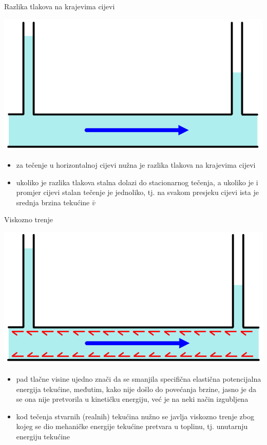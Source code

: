 \documentclass[croatian]{beamer}
\begin{document}
\begin{frame}{Razlika tlakova na krajevima cijevi}

\begin{center}
\includegraphics[width=0.5\paperwidth]{slike/slika2.PNG}
\par\end{center}
\begin{itemize}
\item za tečenje u horizontalnoj cijevi nužna je razlika tlakova na krajevima
cijevi
\item ukoliko je razlika tlakova stalna dolazi do stacionarnog tečenja,
a ukoliko je i promjer cijevi stalan tečenje je \alert{jednoliko},
tj. na svakom presjeku cijevi ista je srednja brzina tekućine $\bar{v}$
\end{itemize}
\end{frame}

\begin{frame}{Viskozno trenje}

\begin{center}
\includegraphics[width=0.5\paperwidth]{slike/slika3.PNG}
\par\end{center}
\begin{itemize}
\item pad tlačne visine ujedno znači da se smanjila specifična elastična
potencijalna energija tekućine, međutim, kako nije došlo do povećanja
brzine, jasno je da se ona nije pretvorila u kinetičku energiju, već
je na neki način izgubljena
\item kod tečenja stvarnih (realnih) tekućina nužno se javlja viskozno trenje
zbog kojeg se dio mehaničke energije tekućine pretvara u toplinu,
tj. unutarnju energiju tekućine
\end{itemize}
\end{frame}
\end{document}
